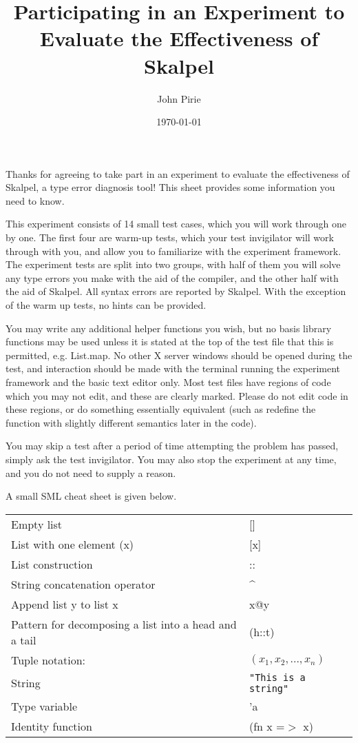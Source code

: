 \documentclass{article}
\author{John Pirie}
\title{Participating in an Experiment to Evaluate the Effectiveness of Skalpel}
\date{\today}
\begin{document}
\maketitle

Thanks for agreeing to take part in an experiment to evaluate the
effectiveness of Skalpel, a type error diagnosis tool! This sheet
provides some information you need to know.

This experiment consists of 14 small test cases, which you will work
through one by one. The first four are warm-up tests, which your test
invigilator will work through with you, and allow you to familiarize
with the experiment framework. The experiment tests are split into two
groups, with half of them you will solve any type errors you make with
the aid of the compiler, and the other half with the aid of
Skalpel. All syntax errors are reported by Skalpel. With the exception
of the warm up tests, no hints can be provided.

You may write any additional helper functions you wish, but no basis
library functions may be used unless it is stated at the top of the
test file that this is permitted, e.g. List.map. No other X server
windows should be opened during the test, and interaction should be
made with the terminal running the experiment framework and the basic
text editor only. Most test files have regions of code which you may
not edit, and these are clearly marked. Please do not edit code in
these regions, or do something essentially equivalent (such as
redefine the function with slightly different semantics later in the
code).

You may skip a test after a period of time attempting the problem has
passed, simply ask the test invigilator. You may also stop the
experiment at any time, and you do not need to supply a reason.

A small SML cheat sheet is given below.

\begin{tabular}{ll}
Empty list & []\\
List with one element (x) & [x]\\
List construction & ::\\
String concatenation operator & \^{} \\
Append list y to list x & x@y\\
Pattern for decomposing a list into a head and a tail & (h::t)\\
Tuple notation: & $(x_1, x_2, ..., x_n)$\\
String & \texttt{"This is a string"} \\
Type variable & 'a\\
Identity function & (fn x =$>$ x)\\
\end{tabular}
\end{document}
